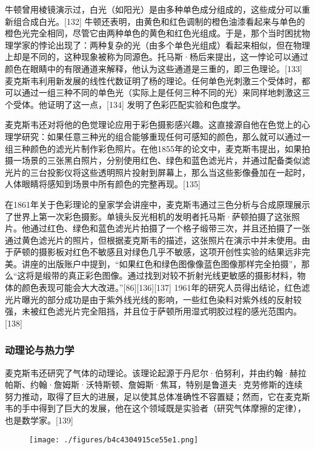 牛顿曾用棱镜演示过，白光（如阳光）是由多种单色成分组成的，这些成分可以重新组合成白光。[132] 牛顿还表明，由黄色和红色调制的橙色油漆看起来与单色的橙色光完全相同，尽管它由两种单色的黄色和红色光组成。于是，那个当时困扰物理学家的悖论出现了：两种复杂的光（由多个单色光组成）看起来相似，但在物理上却是不同的，这种现象被称为同源色。托马斯·杨后来提出，这一悖论可以通过颜色在眼睛中的有限通道来解释，他认为这些通道是三重的，即三色理论。[133] 麦克斯韦利用新发展的线性代数证明了杨的理论。任何单色光刺激三个受体时，都可以通过一组三种不同的单色光（实际上是任何三种不同的光）来同样地刺激这三个受体。他证明了这一点，[134] 发明了色彩匹配实验和色度学。

麦克斯韦还对将他的色觉理论应用于彩色摄影感兴趣。这直接源自他在色觉上的心理学研究：如果任意三种光的组合能够重现任何可感知的颜色，那么就可以通过一组三种颜色的滤光片制作彩色照片。在他1855年的论文中，麦克斯韦提出，如果拍摄一场景的三张黑白照片，分别使用红色、绿色和蓝色滤光片，并通过配备类似滤光片的三台投影仪将这些透明照片投射到屏幕上，那么当这些影像叠加在一起时，人体眼睛将感知到场景中所有颜色的完整再现。[135]

在1861年关于色彩理论的皇家学会讲座中，麦克斯韦通过三色分析与合成原理展示了世界上第一次彩色摄影。单镜头反光相机的发明者托马斯·萨顿拍摄了这张照片。他通过红色、绿色和蓝色滤光片拍摄了一个格子缎带三次，并且还拍摄了一张通过黄色滤光片的照片，但根据麦克斯韦的描述，这张照片在演示中并未使用。由于萨顿的摄影板对红色不敏感且对绿色几乎不敏感，这项开创性实验的结果远非完美。讲座的出版账户中提到，“如果红色和绿色图像像蓝色图像那样完全拍摄”，那么“这将是缎带的真正彩色图像。通过找到对较不折射光线更敏感的摄影材料，物体的颜色表现可能会大大改进。”[86][136][137] 1961年的研究人员得出结论，红色滤光片曝光的部分成功是由于紫外线光线的影响，一些红色染料对紫外线的反射较强，未被红色滤光片完全阻挡，并且位于萨顿所用湿式明胶过程的感光范围内。[138]
\subsubsection{动理论与热力学}
麦克斯韦还研究了气体的动理论。该理论起源于丹尼尔·伯努利，并由约翰·赫拉帕斯、约翰·詹姆斯·沃特斯顿、詹姆斯·焦耳，特别是鲁道夫·克劳修斯的连续努力推动，取得了巨大的进展，足以使其总体准确性不容置疑；然而，它在麦克斯韦的手中得到了巨大的发展，他在这个领域既是实验者（研究气体摩擦的定律），也是数学家。[139]
\begin{figure}[ht]
\centering
\texttt{[image: ./figures/b4c4304915ce55e1.png]}
\caption{} \label{fig_Clerk_12}
\end{figure}
